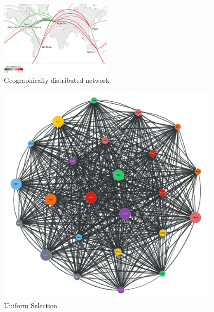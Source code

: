 \begin{figure}[t]
    \centering
    \includegraphics[width=0.5\textwidth]{figures/network}
    \caption{Geographically distributed network}
    \label{fig:network}
\end{figure}

\begin{figure}[t]
    \centering
      \includegraphics[width=\linewidth]{figures/b-uniform-selection-e1}
      \caption{Uniform Selection}\label{fig:uniform_selection}
    \endminipage\hfill

\end{figure}
